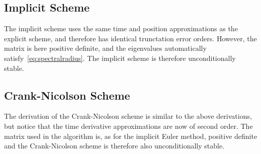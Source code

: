 \documentclass[aps,reprint]{revtex4-1}
\newcommand\blankpage{%
  \null
  \thispagestyle{empty}%
  \addtocounter{page}{-1}%
  \newpage}
\begin{document}
\subsection{Implicit Scheme}
The implicit scheme uses the same time and position approximations as the explicit
scheme, and therefore has identical trunctation error orders. However, the matrix
is here positive definite, and the eigenvalues automatically satisfy~\ref{eq:spectralradius}.
The implicit scheme is therefore unconditionally stable.

\subsection{Crank-Nicolson Scheme}
The derivation of the Crank-Nicolson scheme is similar to the above derivations,
but notice that the time derivative approximations are now of second order. The
matrix used in the algorithm is, as for the implicit Euler method, positive definite
and the Crank-Nicolson scheme is therefore also unconditionally stable.
\blankpage
\end{document}

